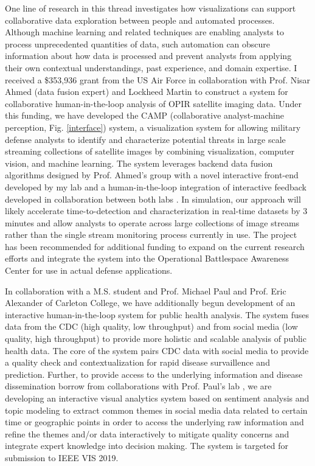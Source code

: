 \documentclass[11pt]{article}
\begin{document}
One line of research in this thread investigates how visualizations can support collaborative data exploration between people and automated processes. Although machine learning and related techniques are enabling analysts to process unprecedented quantities of data, such automation can obscure information about how data is processed and prevent analysts from applying their own contextual understandings, past experience, and domain expertise. I received a \$353,936 grant from the US Air Force in collaboration with Prof. Nisar Ahmed (data fusion expert) and Lockheed Martin to construct a system for collaborative human-in-the-loop analysis of OPIR satellite imaging data. Under this funding, we have developed the CAMP (collaborative analyst-machine perception, Fig. \ref{interface}) system, a visualization system for allowing military defense analysts to identify and characterize potential threats in large scale streaming collections of satellite images by combining visualization, computer vision, and machine learning. The system leverages backend data fusion algorithms designed by Prof. Ahmed's group with a novel interactive front-end developed by my lab and a human-in-the-loop integration of interactive feedback developed in collaboration between both labs \cite{muesing2019}. In simulation, our approach will likely accelerate time-to-detection and characterization in real-time datasets by 3 minutes and allow analysts to operate across large collections of image streams rather than the single stream monitoring process currently in use. The project has been recommended for additional funding to expand on the current research efforts and integrate the system into the Operational Battlespace Awareness Center for use in actual defense applications. 

In collaboration with a M.S. student and Prof. Michael Paul and Prof. Eric Alexander of Carleton College, we have additionally begun development of an interactive human-in-the-loop system for public health analysis. The system fuses data from the CDC (high quality, low throughput) and from social media (low quality, high throughput) to provide more holistic and scalable analysis of public health data. The core of the system pairs CDC data with social media to provide a quality check and contextualization for rapid disease survaillence and prediction. Further, to provide access to the underlying information and disease dissemination borrow from collaborations with Prof. Paul's lab \cite{pruss2019Zika}, we are developing an interactive visual analytics system based on sentiment analysis and topic modeling to extract common themes in social media data related to certain time or geographic points in order to access the underlying raw information and refine the themes and/or data interactively to mitigate quality concerns and integrate expert knowledge into decision making. The system is targeted for submission to IEEE VIS 2019.
\end{document}
